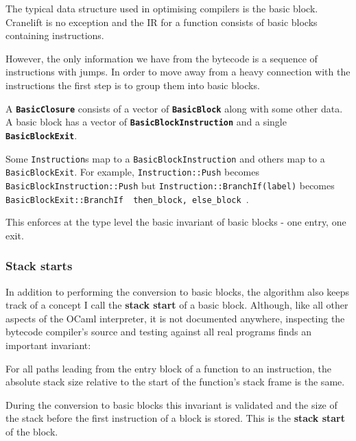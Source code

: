 The typical data structure used in optimising compilers is the basic block. Cranelift is no
exception and the IR for a function consists of basic blocks containing instructions.

However, the only information we have from the bytecode is a sequence of instructions with jumps.
In order to move away from a heavy connection with the instructions the first step is to group them
into
basic blocks.


A \textbf{\texttt{BasicClosure}} consists of a vector of \textbf{\texttt{BasicBlock}} along with
some other data. A basic block has a vector of \textbf{\texttt{BasicBlockInstruction}} and a single
\textbf{\texttt{BasicBlockExit}}.

Some \texttt{Instruction}s map to a \texttt{BasicBlockInstruction} and others map to a
\texttt{BasicBlockExit}. For example, \texttt{Instruction::Push} becomes
\texttt{BasicBlockInstruction::Push} but \texttt{Instruction::BranchIf(label)} becomes
\texttt{BasicBlockExit::BranchIf { then\_block, else\_block }}.

This enforces at the type level the basic invariant of basic blocks - one entry, one exit.

\subsubsection{Stack starts}

In addition to performing the conversion to basic blocks, the algorithm also keeps track of a
concept I call the \textbf{stack start} of a basic block. Although, like all other aspects of the
OCaml interpreter, it is not documented anywhere, inspecting the bytecode compiler's source and
testing against all real programs finds an important invariant:

\begin{framed}
      \noindent
      For all paths leading from the entry block of a function to an instruction, the absolute
      stack size
      relative to the start of the function's stack frame is the same.
\end{framed}

During the conversion to basic blocks this invariant is validated and the size of the stack before
the first instruction of a block is stored. This is the \textbf{stack start} of the block.



